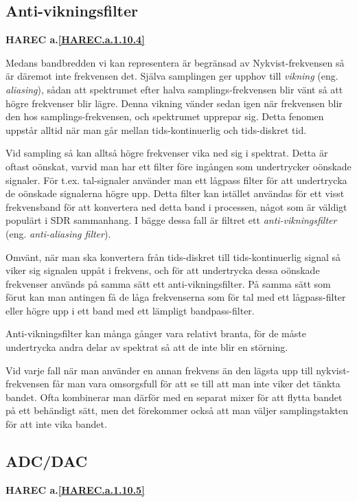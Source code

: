 \subsection{Anti-vikningsfilter}
\textbf{HAREC a.\ref{HAREC.a.1.10.4}\label{myHAREC.a.1.10.4}}

Medans bandbredden vi kan representera är begränsad av Nykvist-frekvensen så
är däremot inte frekvensen det.
Själva samplingen ger upphov till \emph{vikning} (eng. \emph{aliasing}),
sådan att spektrumet efter halva samplings-frekvensen blir vänt så att högre
frekvenser blir lägre.
Denna vikning vänder sedan igen när frekvensen blir den hos
samplings-frekvensen, och spektrumet upprepar sig.
Detta fenomen uppstår alltid när man går mellan tids-kontinuerlig och
tids-diskret tid.


Vid sampling så kan alltså högre frekvenser vika ned sig i spektrat.
Detta är oftast oönskat, varvid man har ett filter före ingången som
undertrycker oönskade signaler.
För t.ex. tal-signaler använder man ett lågpass filter för att undertrycka de
oönskade signalerna högre upp.
Detta filter kan istället användas för ett visst frekvensband för att
konvertera ned detta band i processen, något som är väldigt populärt i SDR
sammanhang.
I bägge dessa fall är filtret ett \emph{anti-vikningsfilter} (eng.
\emph{anti-aliasing filter}).

Omvänt, när man ska konvertera från tids-diskret till tids-kontinuerlig
signal så viker sig signalen uppåt i frekvens, och för att undertrycka dessa
oönskade frekvenser används på samma sätt ett anti-vikningsfilter.
På samma sätt som förut kan man antingen få de låga frekvenserna som för tal
med ett lågpass-filter eller högre upp i ett band med ett lämpligt
bandpass-filter.

Anti-vikningsfilter kan många gånger vara relativt branta, för de måste
undertrycka andra delar av spektrat så att de inte blir en störning.

Vid varje fall när man använder en annan frekvens än den lägsta upp till
nykvist-frekvensen får man vara omsorgsfull för att se till att man inte viker
det tänkta bandet.
Ofta kombinerar man därför med en separat mixer för att flytta bandet på ett
behändigt sätt, men det förekommer också att man väljer samplingstakten för att
inte vika bandet.

\subsection{ADC/DAC}
\textbf{HAREC a.\ref{HAREC.a.1.10.5}\label{myHAREC.a.1.10.5}}

